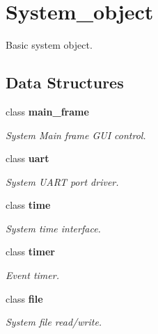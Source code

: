 \section{System\+\_\+object}
\label{group___system__object}


Basic system object.  


\subsection*{Data Structures}
\begin{DoxyCompactItemize}
\item 
class \textbf{ main\+\_\+frame}
\begin{DoxyCompactList}\small\item\em System Main frame G\+UI control. \end{DoxyCompactList}\item 
class \textbf{ uart}
\begin{DoxyCompactList}\small\item\em System U\+A\+RT port driver. \end{DoxyCompactList}\item 
class \textbf{ time}
\begin{DoxyCompactList}\small\item\em System time interface. \end{DoxyCompactList}\item 
class \textbf{ timer}
\begin{DoxyCompactList}\small\item\em Event timer. \end{DoxyCompactList}\item 
class \textbf{ file}
\begin{DoxyCompactList}\small\item\em System file read/write. \end{DoxyCompactList}\end{DoxyCompactItemize}
